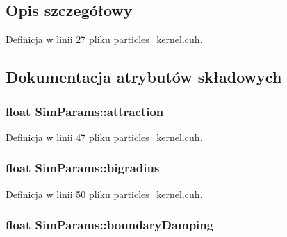 \subsection{Opis szczegółowy}


Definicja w linii \hyperlink{particles__kernel_8cuh_source_l00027}{27} pliku \hyperlink{particles__kernel_8cuh_source}{particles\-\_\-kernel.\-cuh}.



\subsection{Dokumentacja atrybutów składowych}
\hypertarget{struct_sim_params_acf7442ae8a49237861944271cb630d01}{
\subsubsection[{attraction}]{\setlength{\rightskip}{0pt plus 5cm}float Sim\-Params\-::attraction}}\label{struct_sim_params_acf7442ae8a49237861944271cb630d01}


Definicja w linii \hyperlink{particles__kernel_8cuh_source_l00047}{47} pliku \hyperlink{particles__kernel_8cuh_source}{particles\-\_\-kernel.\-cuh}.

\hypertarget{struct_sim_params_af41979948fdd8f76fe28ce2b43eb24cd}{
\subsubsection[{bigradius}]{\setlength{\rightskip}{0pt plus 5cm}float Sim\-Params\-::bigradius}}\label{struct_sim_params_af41979948fdd8f76fe28ce2b43eb24cd}


Definicja w linii \hyperlink{particles__kernel_8cuh_source_l00050}{50} pliku \hyperlink{particles__kernel_8cuh_source}{particles\-\_\-kernel.\-cuh}.

\hypertarget{struct_sim_params_a4da0c7593d6569e48ee50e7d0c7576f9}{
\subsubsection[{boundary\-Damping}]{\setlength{\rightskip}{0pt plus 5cm}float Sim\-Params\-::boundary\-Damping}}\label{struct_sim_params_a4da0c7593d6569e48ee50e7d0c7576f9}


